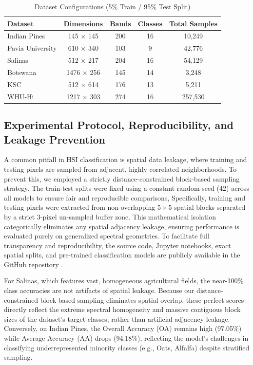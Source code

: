 \documentclass[pdflatex,sn-mathphys-num,iicol]{sn-jnl}
\begin{document}
\begin{table}[htbp]
\centering
\caption{Dataset Configurations (5\% Train / 95\% Test Split)}
\label{tab:datasets}
\footnotesize
\begin{tabular}{lcccc}
\toprule
\textbf{Dataset} & \textbf{Dimensions} & \textbf{Bands} & \textbf{Classes} & \textbf{Total Samples} \\
\midrule
Indian Pines & 145 $\times$ 145 & 200 & 16 & 10,249 \\
Pavia University & 610 $\times$ 340 & 103 & 9 & 42,776 \\
Salinas & 512 $\times$ 217 & 204 & 16 & 54,129 \\
Botswana & 1476 $\times$ 256 & 145 & 14 & 3,248 \\
KSC & 512 $\times$ 614 & 176 & 13 & 5,211 \\
WHU-Hi & 1217 $\times$ 303 & 274 & 16 & 257,530 \\
\bottomrule
\end{tabular}
\end{table}



\subsection{Experimental Protocol, Reproducibility, and Leakage Prevention}\label{sec:leakage}
A common pitfall in HSI classification is spatial data leakage, where training and testing pixels are sampled from adjacent, highly correlated neighborhoods. To prevent this, we employed a strictly distance-constrained block-based sampling strategy. The train-test splits were fixed using a constant random seed (42) across all models to ensure fair and reproducible comparisons, Specifically, training and testing pixels were extracted from non-overlapping $5 \times 5$ spatial blocks separated by a strict 3-pixel un-sampled buffer zone. This mathematical isolation categorically eliminates any spatial adjacency leakage, ensuring performance is evaluated purely on generalized spectral geometries. To facilitate full transparency and reproducibility, the source code, Jupyter notebooks, exact spatial splits, and pre-trained classification models are publicly available in the GitHub repository \cite{devguru2026repo}.

For Salinas, which features vast, homogeneous agricultural fields, the near-100\% class accuracies are not artifacts of spatial leakage. Because our distance-constrained block-based sampling eliminates spatial overlap, these perfect scores directly reflect the extreme spectral homogeneity and massive contiguous block sizes of the dataset's target classes, rather than artificial adjacency leakage. Conversely, on Indian Pines, the Overall Accuracy (OA) remains high (97.05\%) while Average Accuracy (AA) drops (94.18\%), reflecting the model's challenges in classifying underrepresented minority classes (e.g., Oats, Alfalfa) despite stratified sampling.
\end{document}

